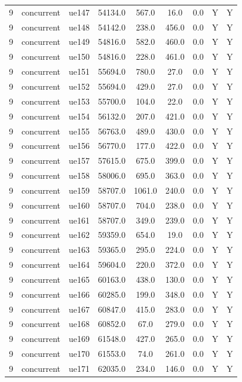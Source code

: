 \begin{table}[ht]
\begin{tabular}{|c|c|c|c|c|c|c|c|c|}
9 & concurrent & ue147 & 54134.0 & 567.0 & 16.0 & 0.0 & Y & Y \\
9 & concurrent & ue148 & 54142.0 & 238.0 & 456.0 & 0.0 & Y & Y \\
9 & concurrent & ue149 & 54816.0 & 582.0 & 460.0 & 0.0 & Y & Y \\
9 & concurrent & ue150 & 54816.0 & 228.0 & 461.0 & 0.0 & Y & Y \\
9 & concurrent & ue151 & 55694.0 & 780.0 & 27.0 & 0.0 & Y & Y \\
9 & concurrent & ue152 & 55694.0 & 429.0 & 27.0 & 0.0 & Y & Y \\
9 & concurrent & ue153 & 55700.0 & 104.0 & 22.0 & 0.0 & Y & Y \\
9 & concurrent & ue154 & 56132.0 & 207.0 & 421.0 & 0.0 & Y & Y \\
9 & concurrent & ue155 & 56763.0 & 489.0 & 430.0 & 0.0 & Y & Y \\
9 & concurrent & ue156 & 56770.0 & 177.0 & 422.0 & 0.0 & Y & Y \\
9 & concurrent & ue157 & 57615.0 & 675.0 & 399.0 & 0.0 & Y & Y \\
9 & concurrent & ue158 & 58006.0 & 695.0 & 363.0 & 0.0 & Y & Y \\
9 & concurrent & ue159 & 58707.0 & 1061.0 & 240.0 & 0.0 & Y & Y \\
9 & concurrent & ue160 & 58707.0 & 704.0 & 238.0 & 0.0 & Y & Y \\
9 & concurrent & ue161 & 58707.0 & 349.0 & 239.0 & 0.0 & Y & Y \\
9 & concurrent & ue162 & 59359.0 & 654.0 & 19.0 & 0.0 & Y & Y \\
9 & concurrent & ue163 & 59365.0 & 295.0 & 224.0 & 0.0 & Y & Y \\
9 & concurrent & ue164 & 59604.0 & 220.0 & 372.0 & 0.0 & Y & Y \\
9 & concurrent & ue165 & 60163.0 & 438.0 & 130.0 & 0.0 & Y & Y \\
9 & concurrent & ue166 & 60285.0 & 199.0 & 348.0 & 0.0 & Y & Y \\
9 & concurrent & ue167 & 60847.0 & 415.0 & 283.0 & 0.0 & Y & Y \\
9 & concurrent & ue168 & 60852.0 & 67.0 & 279.0 & 0.0 & Y & Y \\
9 & concurrent & ue169 & 61548.0 & 427.0 & 265.0 & 0.0 & Y & Y \\
9 & concurrent & ue170 & 61553.0 & 74.0 & 261.0 & 0.0 & Y & Y \\
9 & concurrent & ue171 & 62035.0 & 234.0 & 146.0 & 0.0 & Y & Y \\

\end{tabular}
\end{table}

